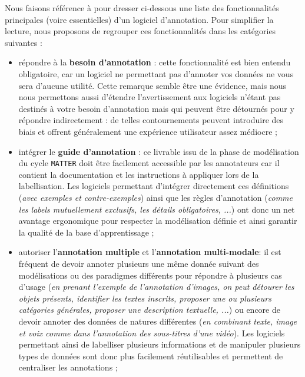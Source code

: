 		Nous faisons référence à \cite{finlayson-erjavec:2016:overview-annotation-creation} pour dresser ci-dessous une liste des fonctionnalités principales (voire essentielles) d'un logiciel d'annotation.
		Pour simplifier la lecture, nous proposons de regrouper ces fonctionnalités dans les catégories suivantes :
		\begin{itemize}
			\item répondre à la \textbf{besoin d'annotation} :
				cette fonctionnalité est bien entendu obligatoire, car un logiciel ne permettant pas d'annoter vos données ne vous sera d'aucune utilité.
				Cette remarque semble être une évidence, mais nous nous permettons aussi d'étendre l’avertissement aux logiciels n'étant pas destinés à votre besoin d'annotation mais qui peuvent être détournés pour y répondre indirectement : de telles contournements peuvent introduire des biais et offrent généralement une expérience utilisateur assez médiocre ;
			\item intégrer le \textbf{guide d'annotation} :
				ce livrable issu de la phase de modélisation du cycle \texttt{MATTER} doit être facilement accessible par les annotateurs car il contient la documentation et les instructions à appliquer lors de la labellisation.
				Les logiciels permettant d'intégrer directement ces définitions (\textit{avec exemples et contre-exemples}) ainsi que les règles d'annotation (\textit{comme les labels mutuellement exclusifs, les détails obligatoires, ...}) ont donc un net avantage ergonomique pour respecter la modélisation définie et ainsi garantir la qualité de la base d'apprentissage ; 
			\item autoriser l'\textbf{annotation multiple} et l'\textbf{annotation multi-modale}: 
				il est fréquent de devoir annoter plusieurs une même donnée suivant des modélisations ou des paradigmes différents pour répondre à plusieurs cas d'usage (\textit{en prenant l'exemple de l'annotation d'images, on peut détourer les objets présents, identifier les textes inscrits, proposer une ou plusieurs catégories générales, proposer une description textuelle, ...}) ou encore de devoir annoter des données de natures différentes (\textit{en combinant texte, image et voix comme dans l'annotation des sous-titres d'une vidéo}).
				Les logiciels permettant ainsi de labelliser plusieurs informations et de manipuler plusieurs types de données sont donc plus facilement réutilisables et permettent de centraliser les annotations ;

\end{itemize}
